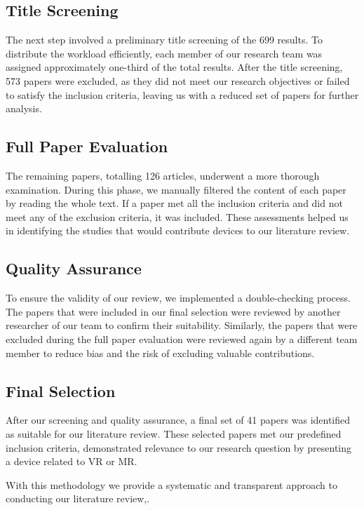 \subsection{Title Screening}
The next step involved a preliminary title screening of the 699 results. To distribute the workload efficiently, each member of our research team was assigned approximately one-third of the total results. After the title screening, 573 papers were excluded, as they did not meet our research objectives or failed to satisfy the inclusion criteria, leaving us with a reduced set of papers for further analysis.


\subsection{Full Paper Evaluation}
The remaining papers, totalling 126 articles, underwent a more thorough examination. During this phase, we manually filtered the content of each paper by reading the whole text. If a paper met all the inclusion criteria and did not meet any of the exclusion criteria, it was included. These assessments helped us in identifying the studies that would contribute devices to our literature review.

\subsection{Quality Assurance}
To ensure the validity of our review, we implemented a double-checking process. The papers that were included in our final selection were reviewed by another researcher of our team to confirm their suitability. Similarly, the papers that were excluded during the full paper evaluation were reviewed again by a different team member to reduce bias and the risk of excluding valuable contributions.

\subsection{Final Selection}
After our screening and quality assurance, a final set of 41 papers was identified as suitable for our literature review. These selected papers met our predefined inclusion criteria, demonstrated relevance to our research question by presenting a device related to VR or MR.

With this methodology we provide a systematic and transparent approach to conducting our literature review,.





